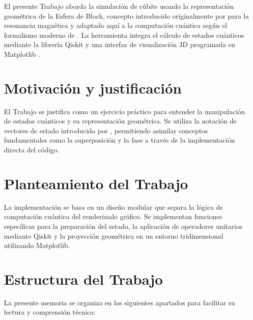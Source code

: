 \documentclass[11pt,a4paper,spanish]{book}
\begin{document}
El presente Trabajo aborda la simulación de cúbits usando la representación geométrica de la Esfera de Bloch, concepto introducido originalmente por \citet{bloch1946} para la resonancia magnética y adaptado aquí a la computación cuántica según el formalismo moderno de \citet{nielsen2010}. La herramienta integra el cálculo de estados cuánticos mediante la librería Qiskit \citep{qiskit2023} y una interfaz de visualización 3D programada en Matplotlib \citep{hunter2007}.

\section{Motivación y justificación}
El Trabajo se justifica como un ejercicio práctico para entender la manipulación de estados cuánticos y su representación geométrica. Se utiliza la notación de vectores de estado introducida por \citet{dirac1981}, permitiendo asimilar conceptos fundamentales como la superposición y la fase a través de la implementación directa del código.

\section{Planteamiento del Trabajo}
La implementación se basa en un diseño modular que separa la lógica de computación cuántica del renderizado gráfico. Se implementan funciones específicas para la preparación del estado, la aplicación de operadores unitarios mediante Qiskit y la proyección geométrica en un entorno tridimensional utilizando Matplotlib.

\section{Estructura del Trabajo}
La presente memoria se organiza en los siguientes apartados para facilitar su lectura y comprensión técnica:
\end{document}
